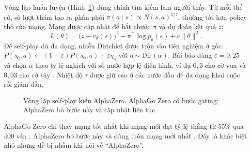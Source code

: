 Vòng lặp huấn luyện (Hình~\ref{fig:lt-vong-lap}) dùng chính tìm kiếm làm người thầy. Từ mỗi thế cờ, số lượt thăm tạo ra phân phối $\pi(a \mid s) \propto N(s, a)^{1/\tau}$, thường tốt hơn policy thô của mạng. Mạng được cập nhật để bắt chước $\pi$ và dự đoán kết quả $z$:
\begin{equation}
  L(\theta) = \big( z - v_\theta(s) \big)^2 - \pi^{\top} \log p_\theta(s) + c \| \theta \|^2.
  \label{eq:az-loss}
\end{equation}
Để self-play đủ đa dạng, nhiễu Dirichlet được trộn vào tiên nghiệm ở gốc: $P(s_0, a) \leftarrow (1 - \varepsilon) P(s_0, a) + \varepsilon \eta_a$ với $\eta \sim \text{Dir}(\alpha)$. Bài báo dùng $\varepsilon = 0{,}25$ và chọn $\alpha$ theo tỷ lệ nghịch với số nước hợp lệ điển hình, ví dụ $0{,}3$ cho cờ vua và $0{,}03$ cho cờ vây \cite{silver2018alphazero}. Nhiệt độ $\tau$ được giữ cao ở các nước đầu để đa dạng khai cuộc rồi giảm dần.

\begin{figure}[!htb]
  \centering
  \caption{Vòng lặp self-play kiểu AlphaZero. AlphaGo Zero có bước gating; AlphaZero bỏ bước này và cập nhật liên tục.}
  \label{fig:lt-vong-lap}
\end{figure}

AlphaGo Zero chỉ thay mạng tốt nhất khi mạng mới đạt tỷ lệ thắng từ 55\% qua 400 ván \cite{silver2017alphagozero}; AlphaZero bỏ bước này và dùng luôn mạng mới nhất \cite{silver2018alphazero}. Đây là khác biệt nhỏ nhưng dễ bị nhầm khi nói về ``AlphaZero''.


